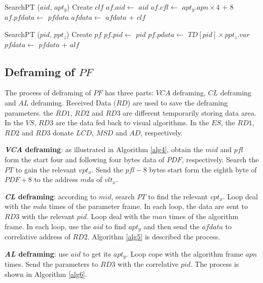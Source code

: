 \documentclass[journal,UTF8]{IEEEtran}
\begin{document}
\begin{algorithm}
	\label{alg2}
	\caption{$CLFraming$}%
	SearchPT ($aid$, $apt_y$)\;
	Create $clf$\;
	$af.aid\leftarrow$ $aid$\;
	$af.cfl \leftarrow$ $apt_y.apn \times 4$ + 8\;
	$af.pfdata \leftarrow$ $pfdata$\;	
	$afdata\leftarrow$ $afdata$ + $clf$\;	 
\end{algorithm}
\begin{algorithm}
	\label{alg3}
	\caption{$ALFraming$}%
	SearchPT ($pid$, $ppt_z$)\;
	Create $pf$\;
	$pf.pid\leftarrow$ $pid$\; %
	$pf.pdata \leftarrow$ $TD[pid]\times ppt_z.var$\;
	$pfdata\leftarrow$ $pfdata$ + $alf$\;	 
\end{algorithm}

\subsection{Deframing of $PF$}
 The process of deframing of $PF$ has three parts: $VCA$ deframing, $CL$ deframing and $AL$ deframing. Received Data ($RD$) are used to save the deframing parameters. the $RD1$, $RD2$ and $RD3$ are different temporarily storing data area. In the $VS$,  $RD3$ are the data fed back to visual algorithms. In the $ES$, the $RD1$, $RD2$ and $RD3$ donate $LCD$, $MSD$ and $AD$, respectively.

\textbf{\emph{VCA} deframing}: as illustrated in Algorithm \ref{alg4}, obtain the $mid$ and $pfl$ form the start four and following four bytes data of $PDF$, respectively. Search the $PT$ to gain the relevant $vpt_x$. Send the $pfl-8$ bytes start form the eighth byte of $PDF+8$ to the address $mda$ of $vlt_x$.

\textbf{\emph{CL} deframing}: according to $mid$, search $PT$ to find the relevant $vpt_x$. Loop deal with the $mda$ times of the parameter frame. In each loop, the data are sent to $RD3$ with the relevant $pid$. Loop deal with the $man$ times of the algorithm frame. In each loop, use the $aid$ to find $apt_y$ and then send the $afdata$ to correlative address of $RD2$. Algorithm \ref{alg5} is described the process.

\textbf{\emph{AL} deframing}: use $aid$ to get its $apt_y$. Loop cope with the algorithm frame $apn$ times. Send the parameters to $RD3$ with the correlative $pid$. The process is shown in Algorithm \ref{alg6}.
\end{document}
